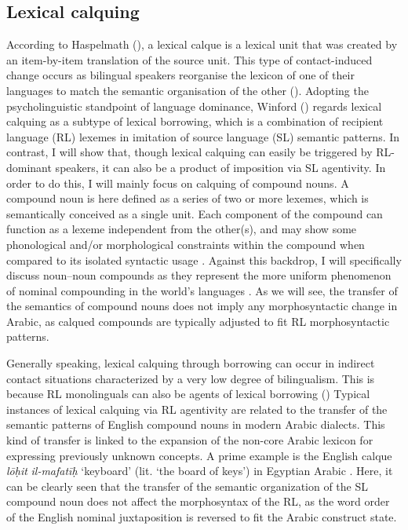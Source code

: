 \documentclass[output=paper]{langsci/langscibook}
\begin{document}
 \subsection{Lexical calquing}\label{sec:lex}

According to Haspelmath (\citeyear[39]{Haspelmath2009}), a lexical calque is a lexical unit that was created by an item-by-item translation of the source unit. This type of contact-induced change occurs as bilingual speakers reorganise the lexicon of one of their languages to match the semantic organisation of the other (\citealt[132]{Ross2007}). Adopting the psycholinguistic standpoint of language dominance, Winford (\citeyear[345]{Winford2003}) regards lexical calquing as a subtype of lexical borrowing, which is a combination of recipient language (RL) lexemes in imitation of source language (SL) semantic patterns. In contrast, I will show that, though lexical calquing can easily be triggered by RL-dominant speakers, it can also be a product of imposition via SL agentivity. In order to do this, I will mainly focus on calquing of compound nouns. A compound noun is here defined as a series of two or more lexemes, which is semantically conceived as a single unit. Each component of the compound can function as a lexeme independent from the other(s), and may show some phonological and/or morphological constraints within the compound when compared to its isolated syntactic usage \citep{Bauer2001}. Against this backdrop, I will specifically discuss noun–noun compounds as they represent the more uniform phenomenon of nominal compounding in the world’s languages \cite{Pepperforthcoming}. As we will see, the transfer of the semantics of compound nouns does not imply any morphosyntactic change in Arabic, as calqued compounds are typically adjusted to fit RL morphosyntactic patterns.  

Generally speaking, lexical calquing through borrowing can occur in indirect contact situations characterized by a very low degree of bilingualism. This is because RL monolinguals can also be agents of lexical borrowing (\citealt[10]{VanCoetsem1988}) Typical instances of lexical calquing via RL agentivity are related to the transfer of the semantic patterns of English compound nouns in modern Arabic dialects. This kind of transfer is linked to the expansion of the non-core Arabic lexicon for expressing previously unknown concepts. A prime example is the English calque \textit{lōḥit} \textit{il-mafatīḥ} `keyboard' (lit. ‘the board of keys’) in Egyptian Arabic \citep[9]{WilmsenWoidich2011}. Here, it can be clearly seen that the transfer of the semantic organization of the SL compound noun does not affect the morphosyntax of the RL, as the word order of the English nominal juxtaposition is reversed to fit the Arabic construct state.  
\end{document}
